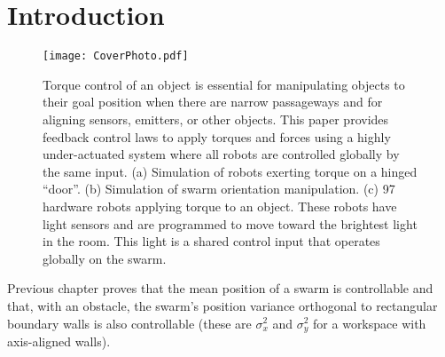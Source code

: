 \section{Introduction}\label{sec:Intro}
 

\begin{figure}
\begin{center}
	\texttt{[image: CoverPhoto.pdf]}
\end{center}
\vspace{-1em}
\caption{\label{fig:FirstImage}
Torque control of an object is essential for manipulating objects to their goal position  when there are narrow passageways and for aligning sensors, emitters, or other objects. 
This paper provides feedback control laws to apply torques and forces using a highly under-actuated system where all 
robots are controlled globally by the same input. 
(a) Simulation of robots exerting torque on a hinged ``door''.
(b) Simulation of swarm orientation manipulation.
(c) 97 hardware robots applying torque to an object. These robots have light sensors and are programmed to move toward the brightest light in the room.  This light is a shared control input that operates globally on the swarm. %
}
\vspace{-1em}
\end{figure}


Previous chapter proves that the mean position of a swarm is controllable and that, with an obstacle, the swarm's position variance orthogonal to rectangular boundary walls  is also controllable
(these are $\sigma_x^2$ and $\sigma_y^2$ for a workspace with axis-aligned walls). 
 
